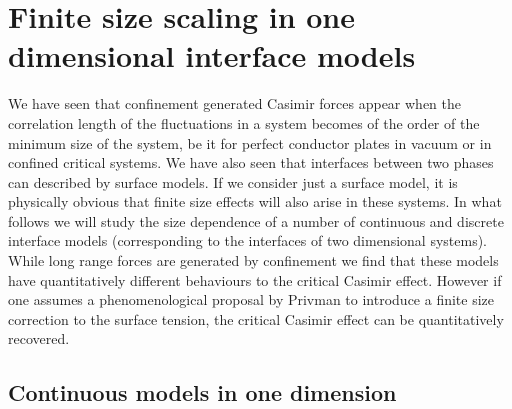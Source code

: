 \section{Finite size scaling in one dimensional interface models}
\label{sec-continuous-interface}

We have seen that confinement generated Casimir forces appear when the correlation length of the fluctuations in a system becomes of the order of the minimum size of the system,  be it for perfect conductor plates in vacuum or in confined critical systems. We have also seen that interfaces between two phases can described by surface models. If we consider just a surface model, it is physically obvious that finite size effects will also arise in these systems. In what follows we will study the size dependence of a number of continuous and discrete interface models (corresponding to the interfaces of two dimensional systems). While long range forces are generated by confinement we find that these models have quantitatively different behaviours to the critical Casimir effect. However if one assumes a phenomenological proposal by Privman \cite{privman_finite-size_1988-1} to introduce a finite size correction to the surface tension, the critical Casimir effect can be quantitatively recovered.

\subsection{Continuous models in one dimension}

